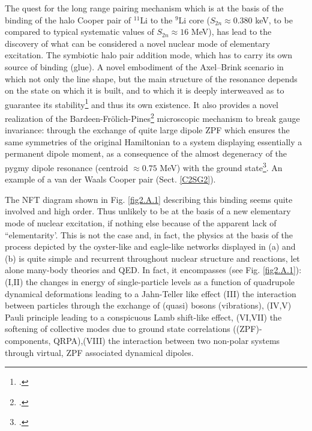 The quest for the long range pairing mechanism which is at the basis of the binding of the halo Cooper pair of $^{11}$Li to the $^9$Li core ($S_{2n}\approx0.380$ keV, to be compared to typical systematic values of $S_{2n}\approx 16$ MeV), has lead to the discovery of what can be considered a novel nuclear mode of elementary excitation. The symbiotic halo pair addition mode, which has to carry its own source of binding (glue). A novel embodiment of the Axel--Brink scenario in which not only the line shape, but the main structure of the resonance depends on the state on which it is built, and to which it is deeply interweaved as to guarantee its stability\footnote{\cite{Axel:62,Brink:55}.} and thus its own existence. It also provides a novel realization of the Bardeen-Fr\"olich-Pines\footnote{\cite{Bardeen:55,Frohlich:52}.} microscopic mechanism to break gauge invariance: 
through the exchange of quite large dipole ZPF which ensures the same symmetries of the original Hamiltonian to a system displaying essentially a permanent dipole moment, as a consequence of the almost degeneracy of the  pygmy dipole resonance (centroid $\approx0.75$ MeV) 
 with the ground state\footnote{\cite{Aumann:19}.}. An example of a van der Waals Cooper pair (Sect. \ref{C2SG2}).



The NFT diagram shown in Fig. \ref{fig2.A.1} describing this binding seems quite involved and high order. Thus unlikely to be at the basis of a new elementary mode of nuclear excitation, if nothing else because of the apparent lack of ``elementarity'. This is not the case and, in fact, the physics at the basis of the process depicted by the oyster-like and eagle-like networks displayed in (a) and (b) is quite simple and recurrent throughout nuclear structure and reactions, let alone many-body theories and QED. In fact, it encompasses (see Fig. \ref{fig2.A.1}): (I,II) the changes in energy of single-particle levels as a function of  quadrupole dynamical deformations leading to a Jahn-Teller like effect (III) the interaction between particles through the exchange of (quasi) bosons (vibrations), (IV,V) Pauli principle leading to a conspicuous Lamb shift-like effect, (VI,VII) the softening of collective modes due to ground state correlations ((ZPF)-components, QRPA),(VIII) the interaction between two non-polar systems through virtual, ZPF associated dynamical dipoles.


